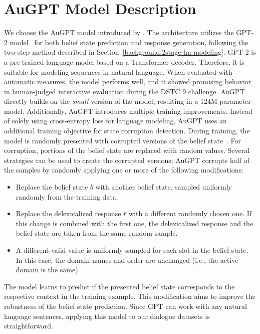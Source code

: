 \section{AuGPT Model Description}
\label{06:augpt}
We choose the AuGPT model introduced by \citet{kulhanek-etal-2021-augpt}.
The architecture utilizes the GPT-2 model~\cite{radford2019language} for both belief state prediction and response generation, following the two-step method described in Section~\ref{background:2stage-lm-modeling}.
GPT-2 is a pre-trained language model based on a Transformer decoder.
Therefore, it is suitable for modeling sequences in natural language.
When evaluated with automatic measures, the model performs well, and it showed promising behavior in human-judged interactive evaluation during the DSTC 9 \citep{gunasekara2020overview} challenge. 
AuGPT directly builds on the \emph{small} version of the model, resulting in a 124M parameter model.
Additionally, AuGPT introduces multiple training improvements.
Instead of solely using cross-entropy loss for language modeling, AuGPT uses an additional training objective for state corruption detection.
During training, the model is randomly presented with corrupted versions of the belief state~\citep{peng2021soloist}.
For corruption, portions of the belief state are replaced with random values.
Several strategies can be used to create the corrupted versions; AuGPT corrupts half of the samples by randomly applying one or more of the following modifications:
\begin{itemize}
    \item Replace the belief state $b$ with another belief state, sampled uniformly randomly from the training data.
    \item Replace the delexicalized response $\bar{r}$ with a different randomly chosen one. If this change is combined with the first one, the delexicalized response and the belief state are taken from the same random sample.
    \item A different valid value is uniformly sampled for each slot in the belief state. In this case, the domain names and order are unchanged (i.e., the active domain is the same).
\end{itemize}
The model learns to predict if the presented belief state corresponds to the respective context in the training example.
This modification aims to improve the robustness of the belief state prediction.
Since GPT can work with any natural language sentences, applying this model to our dialogue datasets is straightforward.

